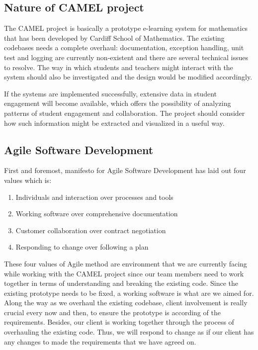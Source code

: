 \subsection*{Nature of CAMEL project}
The CAMEL project is basically a prototype e-learning system for mathematics that has been developed by Cardiff School of Mathematics. The existing codebases needs a complete overhaul: documentation, exception handling, unit test and logging are currently non-existent and there are several technical issues to resolve. The way in which students and teachers might interact with the system should also be investigated and the design would be modified accordingly.
 
	If the systems are implemented successfully, extensive data in student engagement will become available, which offers the possibility of analyzing patterns of student engagement and collaboration. The project should consider how such information might be extracted and visualized in a useful way. 

\subsection*{Agile Software Development}
First and foremost, manifesto for Agile Software Development has laid out four values which is:

\begin{enumerate}[label=(\roman*)] %
\item Individuals and interaction over processes and tools
\item Working software over comprehensive documentation
\item Customer collaboration over contract negotiation
\item Responding to change over following a plan 
\end{enumerate}

These four values of Agile method are environment that we are currently facing while working with the CAMEL project since our team members need to work together in terms of understanding and breaking the existing code. Since the existing prototype needs to be fixed, a working software is what are we aimed for. Along the way as we overhaul the existing codebase, client involvement is really crucial every now and then, to ensure the prototype is according of the requirements. Besides, our client is working together through the process of overhauling the existing code. Thus, we will respond to change as if our client has any changes to made the requirements that we have agreed on.  

